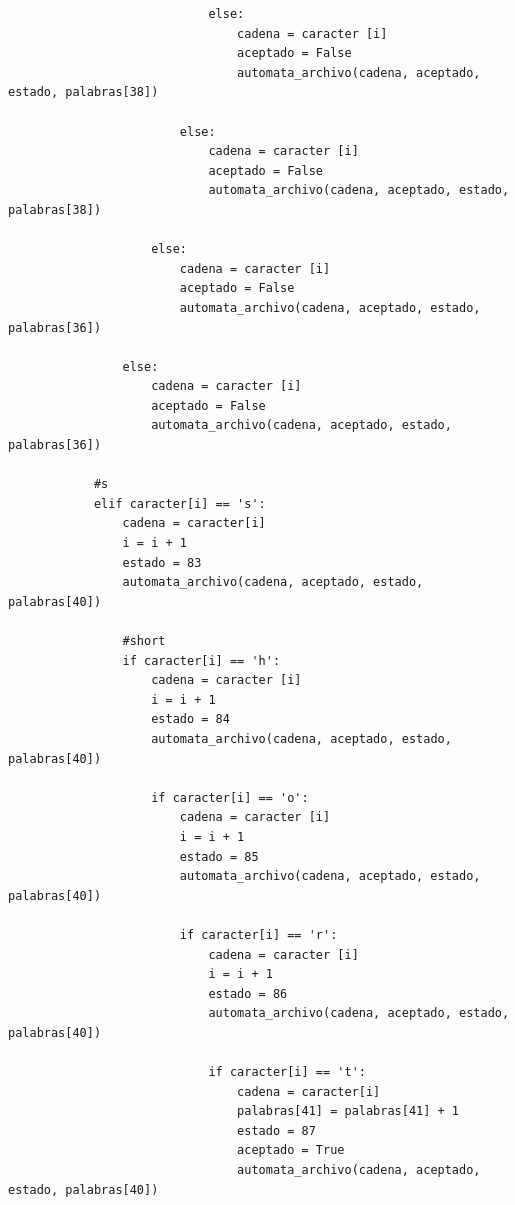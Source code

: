 \documentclass{article}
\begin{document}
\begin{flushleft}
\begin{lstlisting}
                            else:
                                cadena = caracter [i]
                                aceptado = False
                                automata_archivo(cadena, aceptado, estado, palabras[38])
                                
                        else:
                            cadena = caracter [i]
                            aceptado = False
                            automata_archivo(cadena, aceptado, estado, palabras[38])
                            
                    else:
                        cadena = caracter [i]
                        aceptado = False
                        automata_archivo(cadena, aceptado, estado, palabras[36])
                
                else:
                    cadena = caracter [i]
                    aceptado = False
                    automata_archivo(cadena, aceptado, estado, palabras[36])
                                        
            #s
            elif caracter[i] == 's':
                cadena = caracter[i]
                i = i + 1
                estado = 83
                automata_archivo(cadena, aceptado, estado, palabras[40])
                
                #short
                if caracter[i] == 'h':
                    cadena = caracter [i]
                    i = i + 1
                    estado = 84
                    automata_archivo(cadena, aceptado, estado, palabras[40])              
                    
                    if caracter[i] == 'o':
                        cadena = caracter [i]
                        i = i + 1
                        estado = 85
                        automata_archivo(cadena, aceptado, estado, palabras[40])
                        
                        if caracter[i] == 'r':
                            cadena = caracter [i]
                            i = i + 1
                            estado = 86
                            automata_archivo(cadena, aceptado, estado, palabras[40])
                            
                            if caracter[i] == 't':
                                cadena = caracter[i]
                                palabras[41] = palabras[41] + 1
                                estado = 87
                                aceptado = True
                                automata_archivo(cadena, aceptado, estado, palabras[40])
                                

\end{lstlisting}
\end{flushleft}
\end{document}
